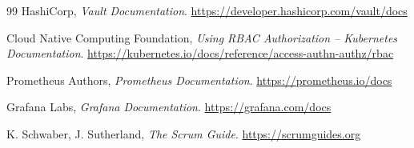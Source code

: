 \begin{thebibliography}{99}
 HashiCorp, \emph{Vault Documentation}. \url{https://developer.hashicorp.com/vault/docs}

 Cloud Native Computing Foundation, \emph{Using RBAC Authorization -- Kubernetes Documentation}. \url{https://kubernetes.io/docs/reference/access-authn-authz/rbac}

 Prometheus Authors, \emph{Prometheus Documentation}. \url{https://prometheus.io/docs}

 Grafana Labs, \emph{Grafana Documentation}. \url{https://grafana.com/docs}

 K. Schwaber, J. Sutherland, \emph{The Scrum Guide}. \url{https://scrumguides.org}

\end{thebibliography}

